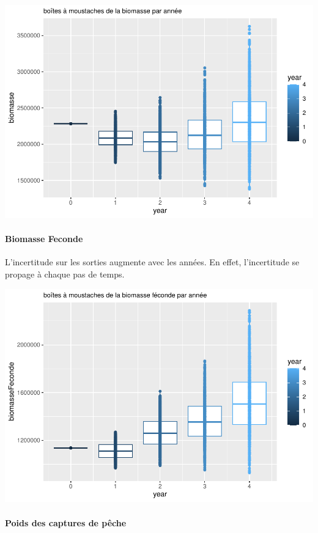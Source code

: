 \documentclass[
]{article}
\begin{document}
\includegraphics{rapport_files/figure-latex/aus-1.pdf}

\hypertarget{biomasse-feconde-5}{%
\paragraph{Biomasse Feconde}\label{biomasse-feconde-5}}

L'incertitude sur les sorties augmente avec les années. En effet,
l'incertitude se propage à chaque pas de temps.

\includegraphics{rapport_files/figure-latex/auxs-1.pdf}

\hypertarget{poids-des-captures-de-puxeache-1}{%
\paragraph{Poids des captures de
pêche}\label{poids-des-captures-de-puxeache-1}}
\end{document}
